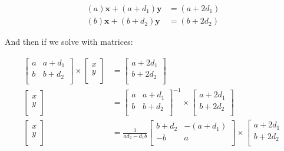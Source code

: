 \documentclass[12pt]{article}
\begin{document}
			
	\begin{align}
		 (a)\bm{x} + (a + d_1)\bm{y} &= (a + 2d_1) \\
		 (b)\bm{x} + (b+d_2)\bm{y} &= (b+2d_2)
	\end{align}

	And then if we solve with matrices:
	
	\begin{align}
		\left [ \begin{array}{cc} 
			a & a + d_1 \\
			b & b + d_2 \\
		\end{array} \right ] \times
		\left [ \begin{array}{c}
			x \\
			y \\
		\end{array}\right ] &= 
		\left [ \begin{array}{c}
			a + 2d_1 \\
			b + 2d_2 \\
		\end{array}\right ] \\
		\left [ \begin{array}{c}
			x \\
			y \\
		\end{array}\right ] &= 
		\left [ \begin{array}{cc} 
			a & a + d_1 \\
			b & b + d_2 \\
		\end{array} \right ]^{-1} \times
		\left [ \begin{array}{c}
			a + 2d_1 \\
			b + 2d_2 \\
		\end{array}\right ] \\
		\left [ \begin{array}{c}
			x \\
			y \\
		\end{array}\right ] &= 
		\frac{1}{ad_2 - d_1b}
		\left [ \begin{array}{cc} 
			b + d_2 & -(a+d_1) \\
			-b & a \\
		\end{array} \right ] \times
		\left [ \begin{array}{c}
			a + 2d_1 \\
			b + 2d_2 \\

\end{array}
\end{align}
\end{document}
